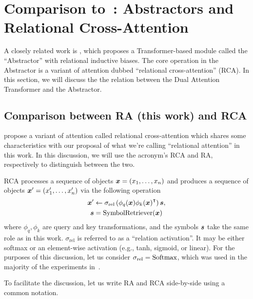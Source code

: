 \section{Comparison to~\citet{altabaa2024abstractors}: Abstractors and Relational Cross-Attention}\label{sec:appdx_abstrator}

A closely related work is \citet{altabaa2024abstractors}, which proposes a Transformer-based module called the ``Abstractor'' with relational inductive biases. The core operation in the Abstractor is a variant of attention dubbed ``relational cross-attention'' (RCA). In this section, we will discuss the the relation between the Dual Attention Transformer and the Abstractor.

\subsection{Comparison between RA (this work) and RCA \citep{altabaa2024abstractors}}

\citet{altabaa2024abstractors} propose a variant of attention called relational cross-attention which shares some characteristics with our proposal of what we're calling ``relational attention'' in this work. In this discussion, we will use the acronym's RCA and RA, respectively to distinguish between the two.

RCA processes a sequence of objects $\bm{x} = (x_1, \ldots, x_n)$ and produces a sequence of objects $\bm{x}' = (x_1', \ldots, x_n')$ via the following operation
\begin{align*}
    \bm{x}' &\gets \sigma_{\mathrm{rel}}\left(\phi_q(\bm{x}) {\phi_k(\bm{x})}^\intercal\right) \bm{s}, \\
    \bm{s} &= \mathrm{SymbolRetriever}(\bm{x})
\end{align*}
where $\phi_q, \phi_k$ are query and key transformations, and the symbols $\bm{s}$ take the same role as in this work. $\sigma_{\mathrm{rel}}$ is referred to as a ``relation activation''. It may be either softmax or an element-wise activation (e.g., tanh, sigmoid, or linear). For the purposes of this discussion, let us consider $\sigma_{\mathrm{rel}} = \mathrm{Softmax}$, which was used in the majority of the experiments in~\citep{altabaa2024abstractors}.

To facilitate the discussion, let us write RA and RCA side-by-side using a common notation.

